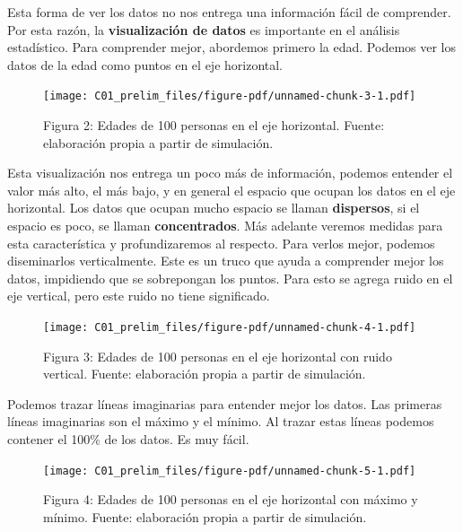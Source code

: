 \documentclass[
  letterpaper,
  DIV=11,
  numbers=noendperiod]{scrreprt}
\begin{document}
Esta forma de ver los datos no nos entrega una información fácil de
comprender. Por esta razón, la \textbf{visualización de datos} es
importante en el análisis estadístico. Para comprender mejor, abordemos
primero la edad. Podemos ver los datos de la edad como puntos en el eje
horizontal.

\begin{figure}[H]

{\centering \texttt{[image: C01\_prelim\_files/figure-pdf/unnamed-chunk-3-1.pdf]}

}

\caption{Figura 2: Edades de 100 personas en el eje horizontal. Fuente:
elaboración propia a partir de simulación.}

\end{figure}%

Esta visualización nos entrega un poco más de información, podemos
entender el valor más alto, el más bajo, y en general el espacio que
ocupan los datos en el eje horizontal. Los datos que ocupan mucho
espacio se llaman \textbf{dispersos}, si el espacio es poco, se llaman
\textbf{concentrados}. Más adelante veremos medidas para esta
característica y profundizaremos al respecto. Para verlos mejor, podemos
diseminarlos verticalmente. Este es un truco que ayuda a comprender
mejor los datos, impidiendo que se sobrepongan los puntos. Para esto se
agrega ruido en el eje vertical, pero este ruido no tiene significado.

\begin{figure}[H]

{\centering \texttt{[image: C01\_prelim\_files/figure-pdf/unnamed-chunk-4-1.pdf]}

}

\caption{Figura 3: Edades de 100 personas en el eje horizontal con ruido
vertical. Fuente: elaboración propia a partir de simulación.}

\end{figure}%

Podemos trazar líneas imaginarias para entender mejor los datos. Las
primeras líneas imaginarias son el máximo y el mínimo. Al trazar estas
líneas podemos contener el 100\% de los datos. Es muy fácil.

\begin{figure}[H]

{\centering \texttt{[image: C01\_prelim\_files/figure-pdf/unnamed-chunk-5-1.pdf]}

}

\caption{Figura 4: Edades de 100 personas en el eje horizontal con
máximo y mínimo. Fuente: elaboración propia a partir de simulación.}

\end{figure}%
\end{document}
